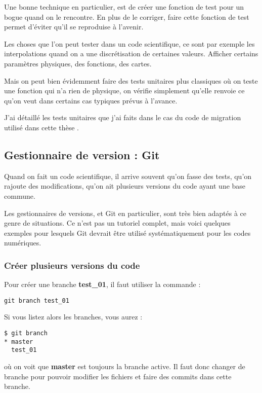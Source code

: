 \begin{remarque}
Une bonne technique en particulier, est de créer une fonction de test pour un bogue quand on le rencontre. En plus de le corriger, faire cette fonction de test permet d'éviter qu'il se reproduise à l'avenir. 
\end{remarque}

Les choses que l'on peut tester dans un code scientifique, ce sont par exemple les interpolations quand on a une discrétisation de certaines valeurs. Afficher certains paramètres physiques, des fonctions, des cartes. 

Mais on peut bien évidemment faire des tests unitaires plus classiques où on teste une fonction qui n'a rien de physique, on vérifie simplement qu'elle renvoie ce qu'on veut dans certains cas typiques prévus à l'avance. 

J'ai détaillé les tests unitaires que j'ai faits dans le cas du code de migration utilisé dans cette thèse .

\subsection{Gestionnaire de version : Git}
Quand on fait un code scientifique, il arrive souvent qu'on fasse des tests, qu'on rajoute des modifications, qu'on ait plusieurs versions du code ayant une base commune. 

Les gestionnaires de versions, et Git en particulier, sont très bien adaptés à ce genre de situations. Ce n'est pas un tutoriel complet, mais voici quelques exemples pour lesquels Git devrait être utilisé systématiquement pour les codes numériques.

\subsubsection{Créer plusieurs versions du code}
Pour créer une branche \textbf{test\_01}, il faut utiliser la commande :
\begin{verbatim}
git branch test_01
\end{verbatim}

Si vous listez alors les branches, vous aurez :
\begin{verbatim}
$ git branch
* master
  test_01
\end{verbatim}
où on voit que \textbf{master} est toujours la branche active. Il faut donc changer de branche pour pouvoir modifier les fichiers et faire des commits dans cette branche.

